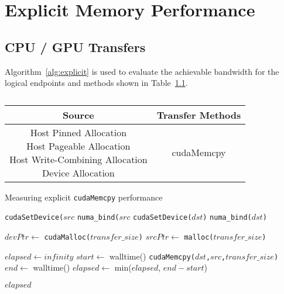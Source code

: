 \chapter{Explicit Memory Performance}
\label{ch:explicit}

\section{CPU / GPU Transfers}

Algorithm~\ref{alg:explicit} is used to evaluate the achievable bandwidth for the logical endpoints and methods shown in Table~\ref{tab:explicit}.

\begin{table}[ht]
    \centering
    \caption[]{}
    \label{tab:explicit}
    \begin{tabular}{|c|c|}
    \hline
    \textbf{Source} & \textbf{Transfer Methods} \\ \hline 
    \makecell{Host Pinned Allocation \\ Host Pageable Allocation \\ Host Write-Combining Allocation \\ Device Allocation} & cudaMemcpy \\ \hline
    \end{tabular}
\end{table}

\begin{algorithm}
    \caption{Measuring explicit \texttt{cudaMemcpy} performance}
    \label{alg:explicit}
    \begin{algorithmic}[1]
    \Statex
            \State \texttt{cudaSetDevice($src$}
        \Else {}
            \State \texttt{numa\_bind($src$}
        \EndIf
        \State \texttt{cudaSetDevice($dst$)}
        \Else {}
        \State \texttt{numa\_bind($dst$)}
        \EndIf

        \State $devPtr \gets$ \texttt{cudaMalloc($transfer\_size$)} 
        \State $srcPtr \gets$ \texttt{malloc($transfer\_size$)} 

        \State $elapsed \gets infinity$ 
            \State $start \gets$ walltime()
            \State \texttt{cudaMemcpy($dst$,$src$,$transfer\_size$)}
            \State $end \gets$ walltime()
            \State $elapsed \gets$ min($elapsed$, $end-start$)
        \EndFor

        \Return $elapsed$
    \EndFunction

    \end{algorithmic}
\end{algorithm}

